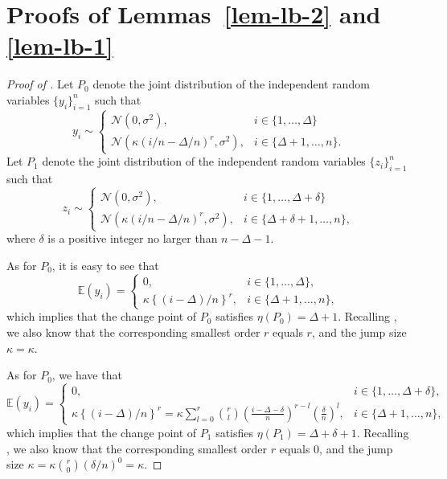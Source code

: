 \documentclass{article}
\begin{document}
\section{Proofs of Lemmas~\ref{lem-lb-2} and \ref{lem-lb-1}}\label{sec-proofs-lb}

\begin{proof}[Proof of ]
Let $P_0$ denote the joint distribution of the independent random variables $\{y_i\}_{i = 1}^n$ such that
	\[
		y_i \sim \begin{cases}
 			\mathcal{N}(0, \sigma^2), & i \in \{1, \ldots, \Delta\} \\
 			\mathcal{N}(\kappa (i/n - \Delta/n)^r, \sigma^2), & i \in \{\Delta + 1, \ldots, n\}. 
 		\end{cases}
	\]
	Let $P_1$ denote the joint distribution of the independent random variables $\{z_i\}_{i = 1}^n$ such that
	\[
		z_i \sim \begin{cases}
 			\mathcal{N}(0, \sigma^2), & i \in \{1, \ldots, \Delta + \delta\} \\
 			\mathcal{N}(\kappa (i/n - \Delta/n)^r, \sigma^2), & i \in \{\Delta + \delta +  1, \ldots, n\},
 		\end{cases}
	\]
	where $\delta$ is a positive integer no larger than $n - \Delta - 1$.
	
As for $P_0$, it is easy to see that 
	\[
		\mathbb{E}(y_i) = \begin{cases}
 			0, & i \in \{1, \ldots, \Delta\}, \\
 			\kappa \left\{(i-\Delta)/n\right\}^r, & i \in \{\Delta + 1, \ldots, n\},
 		\end{cases}
	\]
	which implies that the change point of $P_0$ satisfies $\eta(P_0) = \Delta + 1$.  Recalling , we also know that the corresponding smallest order $r$ equals $r$, and the jump size $\kappa = \kappa$. 
	
As for $P_0$, we have that
	\[
		\mathbb{E}(y_i) = \begin{cases}
 			0, & i \in \{1, \ldots, \Delta + \delta\}, \\
 			\kappa \left\{(i-\Delta)/n\right\}^r = \kappa \sum_{l = 0}^r {r \choose l} \left(\frac{i-\Delta-\delta}{n}\right)^{r-l} \left(\frac{\delta}{n}\right)^l, & i \in \{\Delta + 1, \ldots, n\},
 		\end{cases}
	\]
	which implies that the change point of $P_1$ satisfies $\eta(P_1) = \Delta + \delta + 1$.  Recalling , we also know that the corresponding smallest order $r$ equals 0, and the jump size $\kappa = \kappa {r \choose 0} (\delta/n)^0 = \kappa$. 
	

\end{proof}
\end{document}
